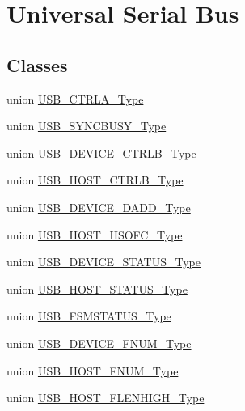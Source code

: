 \hypertarget{group___s_a_m_l21___u_s_b}{}\section{Universal Serial Bus}
\label{group___s_a_m_l21___u_s_b}
\subsection*{Classes}
\begin{DoxyCompactItemize}
\item 
union \hyperlink{union_u_s_b___c_t_r_l_a___type}{U\+S\+B\+\_\+\+C\+T\+R\+L\+A\+\_\+\+Type}
\item 
union \hyperlink{union_u_s_b___s_y_n_c_b_u_s_y___type}{U\+S\+B\+\_\+\+S\+Y\+N\+C\+B\+U\+S\+Y\+\_\+\+Type}
\item 
union \hyperlink{union_u_s_b___d_e_v_i_c_e___c_t_r_l_b___type}{U\+S\+B\+\_\+\+D\+E\+V\+I\+C\+E\+\_\+\+C\+T\+R\+L\+B\+\_\+\+Type}
\item 
union \hyperlink{union_u_s_b___h_o_s_t___c_t_r_l_b___type}{U\+S\+B\+\_\+\+H\+O\+S\+T\+\_\+\+C\+T\+R\+L\+B\+\_\+\+Type}
\item 
union \hyperlink{union_u_s_b___d_e_v_i_c_e___d_a_d_d___type}{U\+S\+B\+\_\+\+D\+E\+V\+I\+C\+E\+\_\+\+D\+A\+D\+D\+\_\+\+Type}
\item 
union \hyperlink{union_u_s_b___h_o_s_t___h_s_o_f_c___type}{U\+S\+B\+\_\+\+H\+O\+S\+T\+\_\+\+H\+S\+O\+F\+C\+\_\+\+Type}
\item 
union \hyperlink{union_u_s_b___d_e_v_i_c_e___s_t_a_t_u_s___type}{U\+S\+B\+\_\+\+D\+E\+V\+I\+C\+E\+\_\+\+S\+T\+A\+T\+U\+S\+\_\+\+Type}
\item 
union \hyperlink{union_u_s_b___h_o_s_t___s_t_a_t_u_s___type}{U\+S\+B\+\_\+\+H\+O\+S\+T\+\_\+\+S\+T\+A\+T\+U\+S\+\_\+\+Type}
\item 
union \hyperlink{union_u_s_b___f_s_m_s_t_a_t_u_s___type}{U\+S\+B\+\_\+\+F\+S\+M\+S\+T\+A\+T\+U\+S\+\_\+\+Type}
\item 
union \hyperlink{union_u_s_b___d_e_v_i_c_e___f_n_u_m___type}{U\+S\+B\+\_\+\+D\+E\+V\+I\+C\+E\+\_\+\+F\+N\+U\+M\+\_\+\+Type}
\item 
union \hyperlink{union_u_s_b___h_o_s_t___f_n_u_m___type}{U\+S\+B\+\_\+\+H\+O\+S\+T\+\_\+\+F\+N\+U\+M\+\_\+\+Type}
\item 
union \hyperlink{union_u_s_b___h_o_s_t___f_l_e_n_h_i_g_h___type}{U\+S\+B\+\_\+\+H\+O\+S\+T\+\_\+\+F\+L\+E\+N\+H\+I\+G\+H\+\_\+\+Type}
\item 

\end{DoxyCompactItemize}
